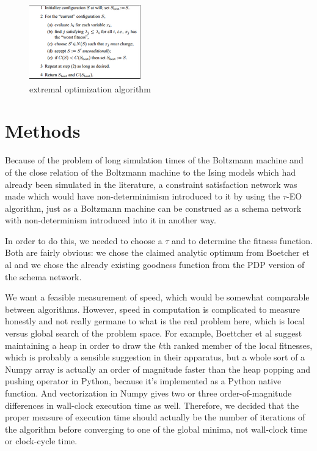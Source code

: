 \documentclass[12pt]{article}
\begin{document}
\begin{figure}
  \includegraphics{eo_alg} %
  \caption{extremal optimization algorithm}
\end{figure}

\section{Methods}

Because of the problem of long simulation times of the Boltzmann machine and of the close relation of the Boltzmann machine to the Ising models which had already been simulated in the literature, a constraint satisfaction network was made which would have non-determinimism introduced to it by using the $\tau$-EO algorithm, just as a Boltzmann machine can be construed as a schema network with non-determinism introduced into it in another way.

In order to do this, we needed to choose a $\tau$ and to determine the fitness function. Both are fairly obvious: we chose the claimed analytic optimum from Boetcher et al and we chose the already existing goodness function from the PDP version of the schema network.

We want a feasible measurement of speed, which would be somewhat comparable between algorithms. However, speed in computation is complicated to measure honestly and not really germane to what is the real problem here, which is local versus global search of the problem space. For example, Boettcher et al suggest maintaining a heap in order to draw the $k$th ranked member of the local fitnesses, which is probably a sensible suggestion in their apparatus, but a whole sort of a Numpy array is actually an order of magnitude faster than the heap popping and pushing operator in Python, because it's implemented as a Python native function. And vectorization in Numpy gives two or three order-of-magnitude differences in wall-clock execution time as well. Therefore, we decided that the proper measure of execution time should actually be the number of iterations of the algorithm before converging to one of the global minima, not wall-clock time or clock-cycle time.
\end{document}
